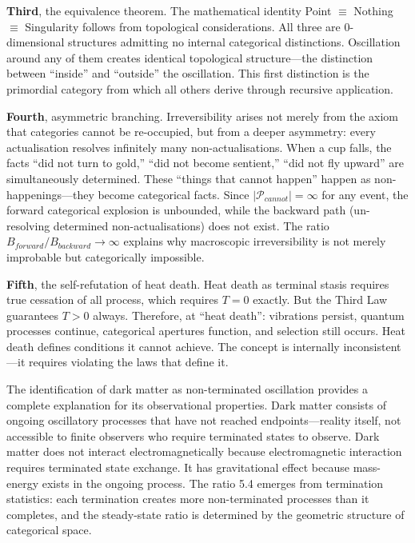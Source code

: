 \textbf{Third}, the equivalence theorem. The mathematical identity Point $\equiv$ Nothing $\equiv$ Singularity follows from topological considerations. All three are 0-dimensional structures admitting no internal categorical distinctions. Oscillation around any of them creates identical topological structure---the distinction between ``inside'' and ``outside'' the oscillation. This first distinction is the primordial category from which all others derive through recursive application.

\textbf{Fourth}, asymmetric branching. Irreversibility arises not merely from the axiom that categories cannot be re-occupied, but from a deeper asymmetry: every actualisation resolves infinitely many non-actualisations. When a cup falls, the facts ``did not turn to gold,'' ``did not become sentient,'' ``did not fly upward'' are simultaneously determined. These ``things that cannot happen'' happen as non-happenings---they become categorical facts. Since $|\mathcal{P}_{cannot}| = \infty$ for any event, the forward categorical explosion is unbounded, while the backward path (un-resolving determined non-actualisations) does not exist. The ratio $B_{forward}/B_{backward} \to \infty$ explains why macroscopic irreversibility is not merely improbable but categorically impossible.

\textbf{Fifth}, the self-refutation of heat death. Heat death as terminal stasis requires true cessation of all process, which requires $T = 0$ exactly. But the Third Law guarantees $T > 0$ always. Therefore, at ``heat death'': vibrations persist, quantum processes continue, categorical apertures function, and selection still occurs. Heat death defines conditions it cannot achieve. The concept is internally inconsistent---it requires violating the laws that define it.

The identification of dark matter as non-terminated oscillation provides a complete explanation for its observational properties. Dark matter consists of ongoing oscillatory processes that have not reached endpoints---reality itself, not accessible to finite observers who require terminated states to observe. Dark matter does not interact electromagnetically because electromagnetic interaction requires terminated state exchange. It has gravitational effect because mass-energy exists in the ongoing process. The ratio 5.4 emerges from termination statistics: each termination creates more non-terminated processes than it completes, and the steady-state ratio is determined by the geometric structure of categorical space.

